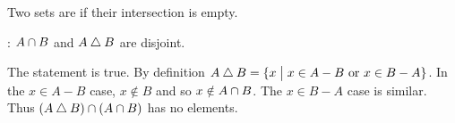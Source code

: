 \documentclass{ibl}  %
\begin{document}
\begin{problem}
\end{problem}

\begin{df}
Two sets are  if their intersection is empty.  
\end{df}

\begin{problem}[\midlength]
 \pord: $A\cap B$ and $A\mathbin{\triangle} B$ are disjoint.
\begin{answer}
  The statement is true.
  By definition $A\mathbin{\triangle} B=\{x \bigm| \text{$x\in A-B$ or $x\in B-A$}\}$.
  In the $x\in A-B$ case, $x\notin B$ and so $x\notin A\cap B$.
  The $x\in B-A$ case is similar.
  Thus $(A\mathbin{\triangle} B)\cap (A\cap B)$ has no elements.  
\end{answer}
\end{problem}
\end{document}
